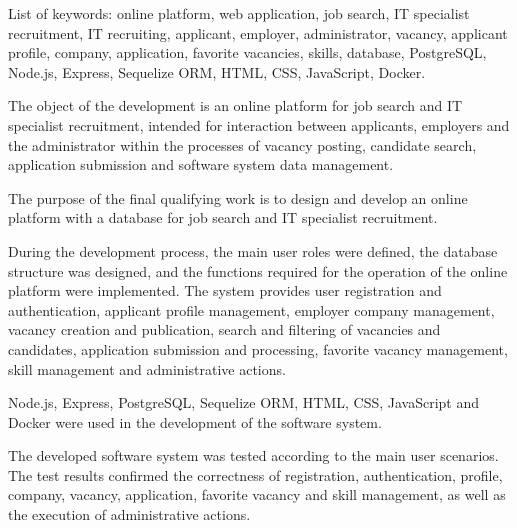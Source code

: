 List of keywords: online platform, web application, job search, IT specialist recruitment, IT recruiting, applicant, employer, administrator, vacancy, applicant profile, company, application, favorite vacancies, skills, database, PostgreSQL, Node.js, Express, Sequelize ORM, HTML, CSS, JavaScript, Docker.

The object of the development is an online platform for job search and IT specialist recruitment, intended for interaction between applicants, employers and the administrator within the processes of vacancy posting, candidate search, application submission and software system data management.

The purpose of the final qualifying work is to design and develop an online platform with a database for job search and IT specialist recruitment.

During the development process, the main user roles were defined, the database structure was designed, and the functions required for the operation of the online platform were implemented. The system provides user registration and authentication, applicant profile management, employer company management, vacancy creation and publication, search and filtering of vacancies and candidates, application submission and processing, favorite vacancy management, skill management and administrative actions.

Node.js, Express, PostgreSQL, Sequelize ORM, HTML, CSS, JavaScript and Docker were used in the development of the software system.

The developed software system was tested according to the main user scenarios. The test results confirmed the correctness of registration, authentication, profile, company, vacancy, application, favorite vacancy and skill management, as well as the execution of administrative actions.

